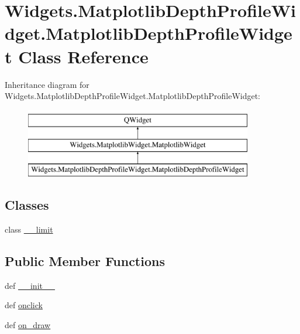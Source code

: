 \hypertarget{classWidgets_1_1MatplotlibDepthProfileWidget_1_1MatplotlibDepthProfileWidget}{\section{Widgets.\-Matplotlib\-Depth\-Profile\-Widget.\-Matplotlib\-Depth\-Profile\-Widget Class Reference}
\label{classWidgets_1_1MatplotlibDepthProfileWidget_1_1MatplotlibDepthProfileWidget}
}
Inheritance diagram for Widgets.\-Matplotlib\-Depth\-Profile\-Widget.\-Matplotlib\-Depth\-Profile\-Widget\-:\begin{figure}[H]
\begin{center}
\leavevmode
\includegraphics[height=3.000000cm]{classWidgets_1_1MatplotlibDepthProfileWidget_1_1MatplotlibDepthProfileWidget}
\end{center}
\end{figure}
\subsection*{Classes}
\begin{DoxyCompactItemize}
\item 
class \hyperlink{classWidgets_1_1MatplotlibDepthProfileWidget_1_1MatplotlibDepthProfileWidget_1_1____limit}{\-\_\-\-\_\-limit}
\end{DoxyCompactItemize}
\subsection*{Public Member Functions}
\begin{DoxyCompactItemize}
\item 
def \hyperlink{classWidgets_1_1MatplotlibDepthProfileWidget_1_1MatplotlibDepthProfileWidget_a8cdd8394cfdb9827714c562f754d6a2d}{\-\_\-\-\_\-init\-\_\-\-\_\-}
\item 
def \hyperlink{classWidgets_1_1MatplotlibDepthProfileWidget_1_1MatplotlibDepthProfileWidget_abb09afd7aabf9bd23c66781f95cf8e6d}{onclick}
\item 
def \hyperlink{classWidgets_1_1MatplotlibDepthProfileWidget_1_1MatplotlibDepthProfileWidget_a1c417e9a539e8c97c0bc897d45570edc}{on\-\_\-draw}
\end{DoxyCompactItemize}
